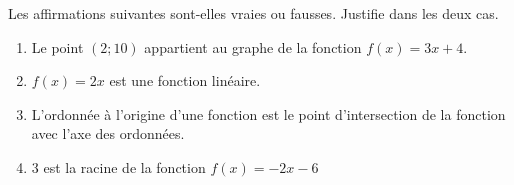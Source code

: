 %
%
    Les affirmations suivantes sont-elles vraies ou fausses. Justifie dans les deux cas.
    \begin{enumerate}
        \item Le point $(2;10)$ appartient au graphe de la fonction $f(x)=3x+4$.
        \item $f(x) = 2x$ est une fonction linéaire.
        \item L'ordonnée à l'origine d'une fonction est le point d'intersection de la fonction avec l'axe des ordonnées.
        \item $3$ est la racine de la fonction $f(x)=-2x-6$
    \end{enumerate}
